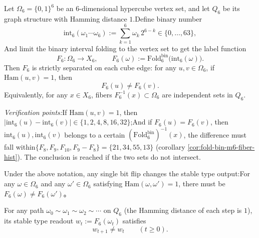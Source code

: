 \begin{enumerate}
\begin{theorem}\label{thm:terminal-foldbin6-cube-edge-separation}Let \(\Omega_6=\{0,1\}^6\) be an \(6\)-dimensional hypercube vertex set, and let \(Q_6\) be its graph structure with Hamming distance \(1\).Define binary number  \[
  \mathrm{int}_6(\omega_1\cdots\omega_6):=\sum_{k=1}^6 \omega_k\,2^{6-k}\in\{0,\dots,63\},
  \]
And limit the binary interval folding to the vertex set to get the label function  \[
  F_6:\Omega_6\to X_6,\qquad F_6(\omega):=\mathrm{Fold}^{\mathrm{bin}}_6\bigl(\mathrm{int}_6(\omega)\bigr).
  \]
Then \(F_6\) is strictly separated on each cube edge: for any \(u,v\in\Omega_6\), if \(\mathrm{Ham}(u,v)=1\), then  \[
  F_6(u)\neq F_6(v).
  \]
Equivalently, for any \(x\in X_6\), fibers \(F_6^{-1}(x)\subset\Omega_6\) are independent sets in \(Q_6\).  \end{theorem}
\emph{Verification points:}If \(\mathrm{Ham}(u,v)=1\), then \(|\mathrm{int}_6(u)-\mathrm{int}_6(v)|\in\{1,2,4,8,16,32\}\);And if \(F_6(u)=F_6(v)\), then \(\mathrm{int}_6(u),\mathrm{int}_6(v)\) belongs to a certain \((\mathrm{Fold}^{\mathrm{bin}}_6)^{-1}(x)\), the difference must fall within\(\{F_8,F_9,F_{10},F_9-F_8\}=\{21,34,55,13\}\) (corollary \ref{cor:fold-bin-m6-fiber-hist}). The conclusion is reached if the two sets do not intersect.
\begin{corollary}\label{cor:terminal-foldbin6-onebit-error-detecting}Under the above notation, any single bit flip changes the stable type output:For any \(\omega\in\Omega_6\) and any \(\omega'\in\Omega_6\) satisfying \(\mathrm{Ham}(\omega,\omega')=1\), there must be  \(F_6(\omega)\neq F_6(\omega')\)。
  \end{corollary}

\begin{corollary}\label{cor:terminal-foldbin6-no-dwell}For any path \(\omega_0\sim \omega_1\sim\omega_2\sim\cdots\) on \(Q_6\) (the Hamming distance of each step is \(1\)), its stable type readout \(w_t:=F_6(\omega_t)\) satisfies  \[
  w_{t+1}\neq w_t\qquad (t\ge 0).
  \]
  \end{corollary}


\end{enumerate}
